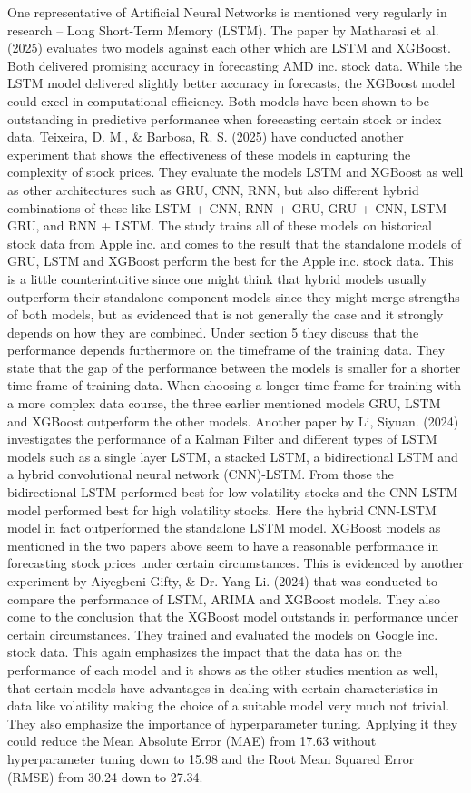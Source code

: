 \documentclass[a4paper,12pt]{report}
\begin{document}
One representative of Artificial Neural Networks is mentioned very regularly in research – Long Short-Term Memory (LSTM). The paper \cite{6} by Matharasi et al. (2025) evaluates two models against each other which are LSTM and XGBoost. Both delivered promising accuracy in forecasting AMD inc. stock data. While the LSTM model delivered slightly better accuracy in forecasts, the XGBoost model could excel in computational efficiency. Both models have been shown to be outstanding in predictive performance when forecasting certain stock or index data. Teixeira, D. M., \& Barbosa, R. S. (2025) have conducted another experiment \cite{13} that shows the effectiveness of these models in capturing the complexity of stock prices. They evaluate the models LSTM and XGBoost as well as other architectures such as GRU, CNN, RNN, but also different hybrid combinations of these like LSTM + CNN, RNN + GRU, GRU + CNN, LSTM + GRU, and RNN + LSTM. The study trains all of these models on historical stock data from Apple inc. and comes to the result that the standalone models of GRU, LSTM and XGBoost perform the best for the Apple inc. stock data. This is a little counterintuitive since one might think that hybrid models usually outperform their standalone component models since they might merge strengths of both models, but as evidenced that is not generally the case and it strongly depends on how they are combined. Under section 5 they discuss that the performance depends furthermore on the timeframe of the training data. They state that the gap of the performance between the models is smaller for a shorter time frame of training data. When choosing a longer time frame for training with a more complex data course, the three earlier mentioned models GRU, LSTM and XGBoost outperform the other models. Another paper \cite{7} by Li, Siyuan. (2024) investigates the performance of a Kalman Filter and different types of LSTM models such as a single layer LSTM, a stacked LSTM, a bidirectional LSTM and a hybrid convolutional neural network (CNN)-LSTM. From those the bidirectional LSTM performed best for low-volatility stocks and the CNN-LSTM model performed best for high volatility stocks. Here the hybrid CNN-LSTM model in fact outperformed the standalone LSTM model. XGBoost models as mentioned in the two papers above seem to have a reasonable performance in forecasting stock prices under certain circumstances. This is evidenced by another experiment \cite{10} by Aiyegbeni Gifty, \& Dr. Yang Li. (2024) that was conducted to compare the performance of LSTM, ARIMA and XGBoost models. They also come to the conclusion that the XGBoost model outstands in performance under certain circumstances. They trained and evaluated the models on Google inc. stock data. This again emphasizes the impact that the data has on the performance of each model and it shows as the other studies mention as well, that certain models have advantages in dealing with certain characteristics in data like volatility making the choice of a suitable model very much not trivial. They also emphasize the importance of hyperparameter tuning. Applying it they could reduce the Mean Absolute Error (MAE) from 17.63 without hyperparameter tuning down to 15.98 and the Root Mean Squared Error (RMSE) from 30.24 down to 27.34.\\
\end{document}
